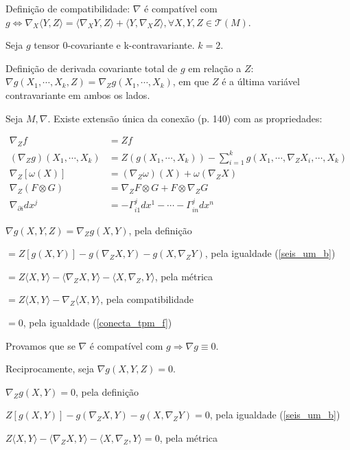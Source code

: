 \documentclass[12pt]{article}
\begin{document}
		Defini\c{c}\~ao de compatibilidade: $\nabla$ \'e compat\'ivel com $g \Leftrightarrow \nabla_X \langle Y, Z \rangle = \langle \nabla_X Y, Z \rangle + \langle Y, \nabla_X Z \rangle, \forall X, Y, Z \in \mathcal{T}(M)$.

		Seja $g$ tensor 0-covariante e k-contravariante. $k = 2$.

		Defini\c{c}\~ao de derivada covariante total de $g$ em rela\c{c}\~ao a $Z$: $\nabla g(X_1,\cdots,X_k, Z) = \nabla_{Z} g(X_1,\cdots,X_k)$, em que $Z$ \'e a \'ultima vari\'avel contravariante em ambos os lados.

		Seja $M, \nabla$. Existe extens\~ao \'unica da conex\~ao (p. 140) com as propriedades:

		\begin{align}
		\nabla_Z f &= Zf \label{conecta_tpm_f} \\
		(\nabla_Z g)(X_1, \cdots, X_k) &= Z(g(X_1, \cdots, X_k)) - \sum_{i=1}^k g(X_1, \cdots, \nabla_Z X_i, \cdots, X_k) \label{seis_um_b} \\
		\nabla_Z [\omega(X)] &= (\nabla_Z \omega)(X) + \omega(\nabla_Z X) \nonumber \\
		\nabla_Z (F \otimes G) &= \nabla_Z F \otimes G + F \otimes \nabla_Z G \nonumber \\
		\nabla_{\partial i} dx^j &= - \Gamma_{i1}^j dx^1 - \cdots - \Gamma_{in}^j dx^n \nonumber
		\end{align}

		$\nabla g (X, Y, Z) = \nabla_Z g(X,Y) $, pela defini\c{c}\~ao

		$= Z [g(X, Y)] - g (\nabla_Z X, Y) - g(X, \nabla_Z Y) $, pela igualdade (\ref{seis_um_b})

		$= Z \langle X, Y\rangle - \langle \nabla_Z X, Y \rangle - \langle X, \nabla_Z, Y \rangle $, pela m\'etrica

		$= Z \langle X, Y\rangle - \nabla_Z \langle X, Y \rangle$, pela compatibilidade

		$= 0$, pela igualdade (\ref{conecta_tpm_f})

		Provamos que se $\nabla$ \'e compat\'ivel com $g \Rightarrow \nabla g \equiv 0$.

		Reciprocamente, seja $\nabla g(X,Y,Z) = 0$.

		$\nabla_Z g(X,Y) = 0$, pela defini\c{c}\~ao

		$Z [g(X, Y)] - g (\nabla_Z X, Y) - g(X, \nabla_Z Y) = 0$, pela igualdade (\ref{seis_um_b})

		$Z \langle X, Y\rangle - \langle \nabla_Z X, Y \rangle - \langle X, \nabla_Z, Y \rangle = 0$, pela m\'etrica
\end{document}
